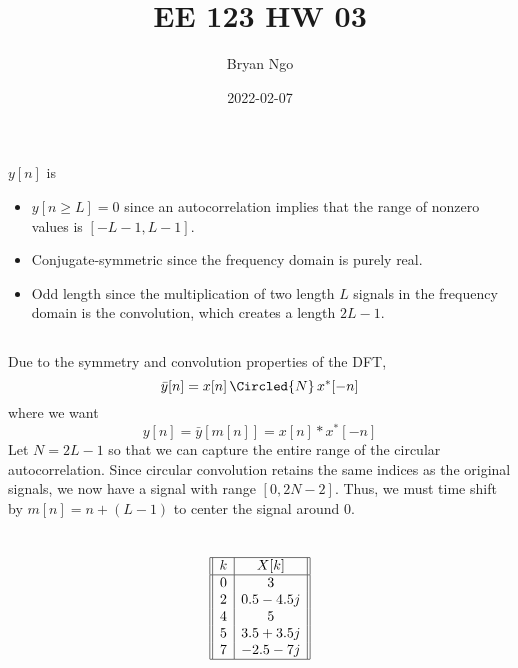 \documentclass{article}
\title{EE 123 HW 03}
\author{Bryan Ngo}
\date{2022-02-07}
\begin{document}
\maketitle

\setcounter{section}{2}

\section{}

\subsection{}

\(y[n]\) is
\begin{itemize}
    \item \(y[n \geqslant L] = 0\) since an autocorrelation implies that the range of nonzero values is \([-L - 1, L - 1]\).
    \item Conjugate-symmetric since the frequency domain is purely real.
    \item Odd length since the multiplication of two length \(L\) signals in the frequency domain is the convolution, which creates a length \(2L - 1\).
\end{itemize}

\subsection{}

Due to the symmetry and convolution properties of the DFT,
\begin{equation}
    \bar{y}[n] = x[n] \, \Circled{N} \, x^\ast[-n]
\end{equation}
where we want
\begin{equation}
    y[n] = \bar{y}[m[n]] = x[n] \ast x^\ast[-n]
\end{equation}
Let \(N = 2L - 1\) so that we can capture the entire range of the circular autocorrelation.
Since circular convolution retains the same indices as the original signals, we now have a signal with range \([0, 2N - 2]\).
Thus, we must time shift by \(m[n] = n + (L - 1)\) to center the signal around 0.

\newpage
\section{}

\begin{equation}
    \begin{array}[]{||c|c||}
        \hline
        k & X[k] \\
        \hline
        0 & 3 \\
        2 & 0.5 - 4.5j \\
        4 & 5 \\
        5 & 3.5 + 3.5j \\
        7 & -2.5 - 7j \\
        \hline
    \end{array}
\end{equation}
\end{document}
